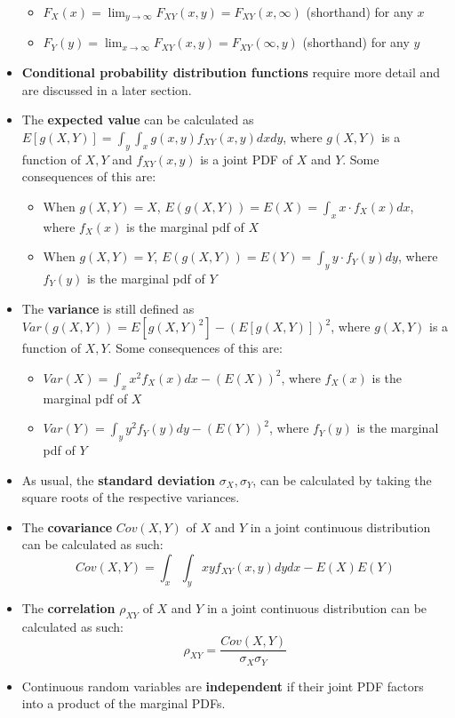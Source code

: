 \documentclass[12pt]{article}
\begin{document}
\begin{itemize}
	      \begin{itemize}
		      \item $F_X(x) = \lim_{y\to\infty}F_{XY}(x, y) = F_{XY} (x, \infty)$ (shorthand) for any $x$
		      \item $F_Y(y) = \lim_{x\to\infty}F_{XY}(x, y) = F_{XY} (\infty, y)$ (shorthand) for any $y$
	      \end{itemize}
	\item \textbf{Conditional probability distribution functions} require more detail and are discussed in a later section.
	\item The \textbf{expected value} can be calculated as $E[g(X, Y)] = \int_{y} \int_{x} g(x, y) f_{XY}(x, y) dx dy$, where $g(X, Y)$ is a
	      function of $X, Y$ and $f_{XY}(x, y)$ is a joint PDF of $X$ and $Y$. Some consequences of this are:
	      \begin{itemize}
		      \item When $g(X, Y) = X$, $E(g(X, Y)) = E(X) = \int_{x} x\cdot f_X(x)dx$, where $f_X(x)$ is the marginal pdf of $X$
		      \item When $g(X, Y) = Y$, $E(g(X, Y)) = E(Y) = \int_{y} y\cdot f_Y(y)dy$, where $f_Y(y)$ is the marginal pdf of $Y$
	      \end{itemize}
	\item The \textbf{variance} is still defined as $Var(g(X, Y)) = E[g(X,
				      Y)^2] - (E[g(X, Y)])^2$, where $g(X, Y)$ is a function of $X, Y$. Some
	      consequences of this are:
	      \begin{itemize}
		      \item $Var(X) = \int_{x} x^2 f_X(x)dx - (E(X))^2$, where $f_X(x)$ is the marginal pdf of $X$
		      \item $Var(Y) = \int_{y} y^2 f_Y(y)dy - (E(Y))^2$, where $f_Y(y)$ is the marginal pdf of $Y$
	      \end{itemize}
	\item As usual, the \textbf{standard deviation} $\sigma_X, \sigma_Y$,
	      can be calculated by taking the square roots of the respective
	      variances.
	\item The \textbf{covariance} $Cov(X, Y)$ of $X$ and $Y$ in a joint continuous distribution can be calculated as such:
	      \[
		      Cov(X, Y) = \int_{x} \int_{y} xy f_{XY} (x, y) dy dx - E(X)E(Y)
	      \]
	\item The \textbf{correlation} $\rho_{XY}$ of $X$ and $Y$ in a joint continuous distribution can be calculated as such:
	      \[
		      \rho_{XY} = \frac{Cov(X, Y)}{\sigma_X \sigma_Y}
	      \]
	\item Continuous random variables are \textbf{independent} if their joint PDF
	      factors into a product of the marginal PDFs.
\end{itemize}
\end{document}

